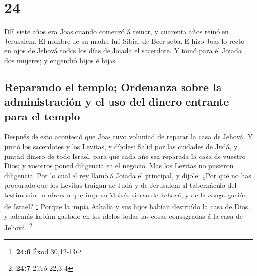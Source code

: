 \hypertarget{section-23}{%
\section{24}\label{section-23}}

 DE siete años era Joas cuando comenzó á reinar, y
cuarenta años reinó en Jerusalem. El nombre de su madre fué Sibia, de
Beer-seba.  E hizo Joas lo recto en ojos de Jehová todos
los días de Joiada el sacerdote.  Y tomó para él Joiada
dos mujeres; y engendró hijos é hijas.

\hypertarget{reparando-el-templo-ordenanza-sobre-la-administraciuxf3n-y-el-uso-del-dinero-entrante-para-el-templo}{%
\subsection{Reparando el templo; Ordenanza sobre la administración y el
uso del dinero entrante para el
templo}\label{reparando-el-templo-ordenanza-sobre-la-administraciuxf3n-y-el-uso-del-dinero-entrante-para-el-templo}}

 Después de esto aconteció que Joas tuvo voluntad de
reparar la casa de Jehová.  Y juntó los sacerdotes y los
Levitas, y díjoles: Salid por las ciudades de Judá, y juntad dinero de
todo Israel, para que cada año sea reparada la casa de vuestro Dios; y
vosotros poned diligencia en el negocio. Mas los Levitas no pusieron
diligencia.  Por lo cual el rey llamó á Joiada el
principal, y díjole: ¿Por qué no has procurado que los Levitas traigan
de Judá y de Jerusalem al tabernáculo del testimonio, la ofrenda que
impuso Moisés siervo de Jehová, y de la congregación de Israel?
\footnote{\textbf{24:6} Éxod 30,12-13}  Porque la impía
Athalía y sus hijos habían destruído la casa de Dios, y además habían
gastado en los ídolos todas las cosas consagradas á la casa de Jehová.
\footnote{\textbf{24:7} 2Cró 22,3-4}

